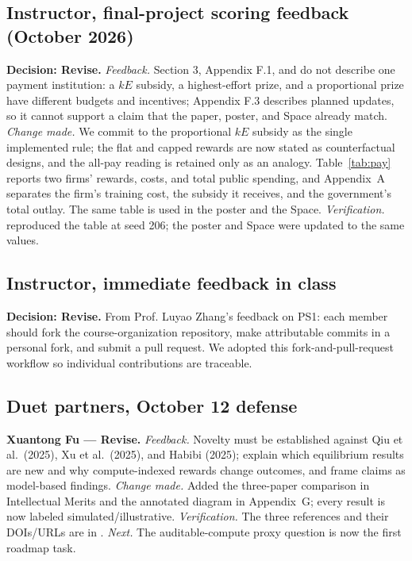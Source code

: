 \subsection{Instructor, final-project scoring feedback (October 2026)}
\noindent\textbf{Decision: Revise.} \emph{Feedback.} Section 3, Appendix F.1, and  do not describe one payment institution: a $kE$ subsidy, a highest-effort prize, and a proportional prize have different budgets and incentives; Appendix F.3 describes planned updates, so it cannot support a claim that the paper, poster, and Space already match. \emph{Change made.} We commit to the proportional $kE$ subsidy as the single implemented rule; the flat and capped rewards are now stated as counterfactual designs, and the all-pay reading is retained only as an analogy. Table~\ref{tab:pay} reports two firms' rewards, costs, and total public spending, and Appendix~A separates the firm's training cost, the subsidy it receives, and the government's total outlay. The same table is used in the poster and the Space. \emph{Verification.}  reproduced the table at seed 206; the poster and Space were updated to the same values.

\subsection{Instructor, immediate feedback in class}
\noindent\textbf{Decision: Revise.} From Prof. Luyao Zhang's feedback on PS1: each member should fork the course-organization repository, make attributable commits in a personal fork, and submit a pull request. We adopted this fork-and-pull-request workflow so individual contributions are traceable.

\subsection{Duet partners, October 12 defense}
\noindent\textbf{Xuantong Fu --- Revise.} \emph{Feedback.} Novelty must be established against Qiu et al.\ (2025), Xu et al.\ (2025), and Habibi (2025); explain which equilibrium results are new and why compute-indexed rewards change outcomes, and frame claims as model-based findings. \emph{Change made.} Added the three-paper comparison in Intellectual Merits and the annotated diagram in Appendix~G; every result is now labeled simulated/illustrative. \emph{Verification.} The three references and their DOIs/URLs are in . \emph{Next.} The auditable-compute proxy question is now the first roadmap task.

